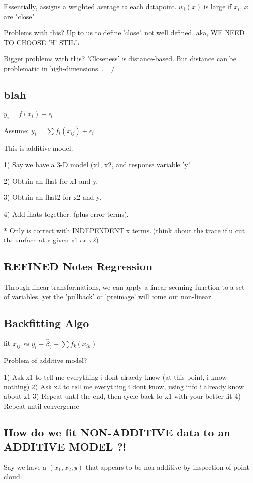 \documentclass[12pt]{article}
\begin{document}
Essentially, assigns a weighted average to each datapoint. $w_i(x)$ is large if $x_i$, $x$ are "close"

Problems with this? Up to us to define 'close'. not well defined. aka, WE NEED TO CHOOSE 'H' STILL

Bigger problems with this? 'Closeness' is distance-based. But distance can be problematic in high-dimensions... =/


\subsection{blah}

$y_i = f(x_i) + \epsilon_i $

Assume:
$y_i = \sum f_i(x_{ij}) + \epsilon_i $

This is additive model.

1) Say we have a 3-D model (x1, x2, and response variable 'y'.

2) Obtain an fhat for x1 and y. 

3) Obtain an fhat2 for x2 and y.

4) Add fhats together. (plus error terms).

* Only is correct with INDEPENDENT x terms.  (think about the trace if u cut the surface at a given
x1 or x2)


\subsection{REFINED Notes Regression}

Through linear transformations, we can apply a linear-seeming function to a set of variables, yet the 'pullback' or 'preimage' will come out non-linear. 


\subsection{Backfitting Algo}

fit $x_{ij}$ vs $y_i-\hat{\beta}_0 - \sum f_k(x_{ik})$ 

Problem of additive model? 

1) Ask x1 to tell me everything i dont alraedy know (at this point, i know nothing)
2) Ask x2 to tell me everything i dont know, using info i already know about x1 
3) Repeat until the end, then cycle back to x1 with your better fit
4) Repeat until convergence


\subsection{How do we fit NON-ADDITIVE data to an ADDITIVE MODEL ?!}
Say we have a $(x_1,x_2,y)$ that appears to be non-additive by inspection of point cloud. \\
\end{document}
